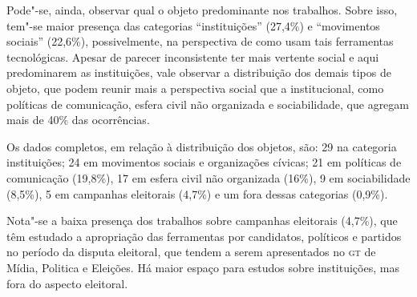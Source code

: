 Pode"-se, ainda, observar qual o objeto predominante nos trabalhos. Sobre
isso, tem"-se maior presença das categorias ``instituições'' (27,4\%) e
``movimentos sociais'' (22,6\%), possivelmente, na perspectiva de como
usam tais ferramentas tecnológicas. Apesar de parecer inconsistente ter
mais vertente social e aqui predominarem as instituições, vale observar
a distribuição dos demais tipos de objeto, que podem reunir mais a
perspectiva social que a institucional, como políticas de comunicação,
esfera civil não organizada e sociabilidade, que agregam mais de 40\%
das ocorrências.

Os dados completos, em relação à distribuição dos objetos, são: 29 na categoria instituições; 24 em movimentos sociais e organizações cívicas; 21 em políticas de comunicação (19,8\%), 17 em esfera civil não organizada (16\%), 9 em sociabilidade (8,5\%), 5 em campanhas eleitorais (4,7\%) e um fora dessas categorias (0,9\%).

Nota"-se a baixa presença dos trabalhos sobre campanhas eleitorais
(4,7\%), que têm estudado a apropriação das ferramentas por candidatos,
políticos e partidos no período da disputa eleitoral, que tendem a serem
apresentados no \textsc{gt} de Mídia, Politica e Eleições. Há maior espaço para
estudos sobre instituições, mas fora do aspecto eleitoral.

